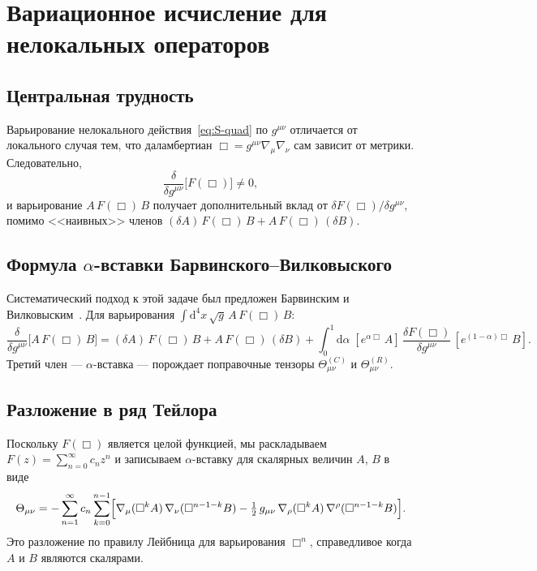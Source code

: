 \documentclass[12pt,a4paper]{article}
\newcommand{\dd}{\mathrm{d}}
\theoremstyle{plain}
\theoremstyle{definition}
\begin{document}
\section{Вариационное исчисление для нелокальных операторов}
\label{sec:variation}

\subsection{Центральная трудность}

Варьирование нелокального действия~\eqref{eq:S-quad} по $g^{\mu\nu}$
отличается от локального случая тем, что даламбертиан
$\Box = g^{\mu\nu}\nabla_\mu\nabla_\nu$ сам зависит от метрики.
Следовательно,
\begin{equation}\label{eq:delta-noncommute}
  \frac{\delta}{\delta g^{\mu\nu}}\bigl[F(\Box)\bigr] \neq 0,
\end{equation}
и варьирование $A\,F(\Box)\,B$ получает дополнительный вклад от
$\delta F(\Box)/\delta g^{\mu\nu}$, помимо <<наивных>> членов
$(\delta A)\,F(\Box)\,B + A\,F(\Box)\,(\delta B)$.

\subsection{Формула \texorpdfstring{$\alpha$}{альфа}-вставки
Барвинского--Вилковыского}

Систематический подход к этой задаче был предложен Барвинским и
Вилковыским~\cite{Barvinsky:1985an,Barvinsky:1990up}.
Для варьирования $\int\dd^4x\,\sqrt{g}\,A\,F(\Box)\,B$:
\begin{equation}\label{eq:BV-alpha}
  \frac{\delta}{\delta g^{\mu\nu}}\bigl[A\,F(\Box)\,B\bigr]
  = (\delta A)\,F(\Box)\,B + A\,F(\Box)\,(\delta B)
  + \int_0^1\dd\alpha\;
  [e^{\alpha\Box}\,A]\,
  \frac{\delta F(\Box)}{\delta g^{\mu\nu}}\,
  [e^{(1-\alpha)\Box}\,B].
\end{equation}
Третий член --- $\alpha$-вставка --- порождает поправочные тензоры
$\Theta^{(C)}_{\mu\nu}$ и $\Theta^{(R)}_{\mu\nu}$.

\subsection{Разложение в ряд Тейлора}

Поскольку $F(\Box)$ является целой функцией, мы раскладываем
$F(z) = \sum_{n=0}^{\infty} c_n z^n$ и записываем $\alpha$-вставку для
скалярных величин $A$, $B$ в виде
\begin{equation}\label{eq:Theta-Taylor}
  \Theta_{\mu\nu} = -\sum_{n=1}^{\infty} c_n
  \sum_{k=0}^{n-1}
  \Bigl[\nabla_\mu(\Box^k A)\,\nabla_\nu(\Box^{n-1-k} B)
  - \tfrac{1}{2}\,g_{\mu\nu}\,\nabla_\rho(\Box^k A)\,
  \nabla^\rho(\Box^{n-1-k} B)\Bigr].
\end{equation}
Это разложение по правилу Лейбница для варьирования $\Box^n$, справедливое
когда $A$ и $B$ являются скалярами.
\end{document}
